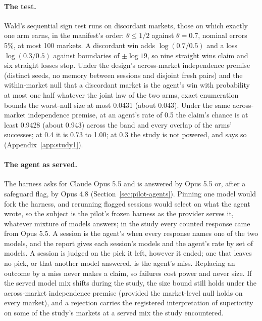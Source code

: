 \documentclass[11pt]{article}
\begin{document}
\paragraph{The test.} Wald's sequential sign test \cite{wald1945} runs on discordant markets, those on which exactly one arm earns, in the manifest's order: $\theta\le1/2$ against $\theta=0.7$, nominal errors 5\%, at most 100 markets. A discordant win adds $\log(0.7/0.5)$ and a loss $\log(0.3/0.5)$ against boundaries of $\pm\log19$, so nine straight wins claim and six straight losses stop. Under the design's across-market independence premise (distinct seeds, no memory between sessions and disjoint fresh pairs) and the within-market null that a discordant market is the agent's win with probability at most one half whatever the joint law of the two arms, exact enumeration bounds the worst-null size at most 0.0431 (about 0.043). Under the same across-market independence premise, at an agent's rate of 0.5 the claim's chance is at least 0.9428 (about 0.943) across the band and every overlap of the arms' successes; at 0.4 it is 0.73 to 1.00; at 0.3 the study is not powered, and says so (Appendix~\ref{app:study1}).

\paragraph{The agent as served.} The harness asks for Claude Opus 5.5 and is answered by Opus 5.5 or, after a safeguard flag, by Opus 4.8 (Section~\ref{sec:pilot-agents}). Pinning one model would fork the harness, and rerunning flagged sessions would select on what the agent wrote, so the subject is the pilot's frozen harness as the provider serves it, whatever mixture of models answers; in the study every counted response came from Opus 5.5. A session is the agent's when every response names one of the two models, and the report gives each session's models and the agent's rate by set of models. A session is judged on the pick it left, however it ended; one that leaves no pick, or that another model answered, is the agent's miss. Replacing an outcome by a miss never makes a claim, so failures cost power and never size. If the served model mix shifts during the study, the size bound still holds under the across-market independence premise (provided the market-level null holds on every market), and a rejection carries the registered interpretation of superiority on some of the study's markets at a served mix the study encountered.
\end{document}
